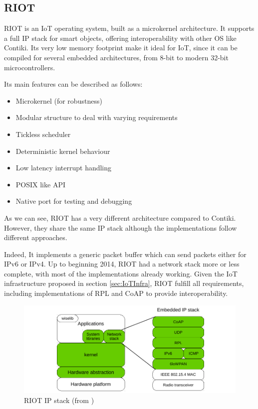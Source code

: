 \subsection{RIOT}
RIOT is an IoT operating system\cite{baccelli2013riot}, built as a microkernel architecture.
It supports a full IP stack for smart objects, offering interoperability with other OS like Contiki.
Its very low memory footprint make it ideal for IoT, since it can be compiled for several embedded architectures, from 8-bit to modern 32-bit microcontrollers.

Its main features can be described as follows:

\begin{itemize}
	\item Microkernel (for robustness)
	\item Modular structure to deal with varying requirements
	\item Tickless scheduler
	\item Deterministic kernel behaviour
	\item Low latency interrupt handling
	\item POSIX like API
	\item Native port for testing and debugging
\end{itemize}

As we can see, RIOT has a very different architecture compared to Contiki.
However, they share the same IP stack although the implementations follow different approaches.


Indeed, It implements a generic packet buffer which can send packets either for IPv6 or IPv4.
Up to beginning 2014, RIOT had a network stack more or less complete, with most of the implementations already working.
Given the IoT infrastructure proposed in section \ref{sec:IoTInfra}, RIOT fulfill all requirements, including implementations of RPL and CoAP to provide interoperability.

\begin{figure}[htb]
	\centering
	\includegraphics[width=1\columnwidth]{chapters/background.images/RIOTModules.pdf}
	\caption{RIOT IP stack (from \cite{riotOS})}
	\label{fig:RIOTIPStack}
\end{figure}

